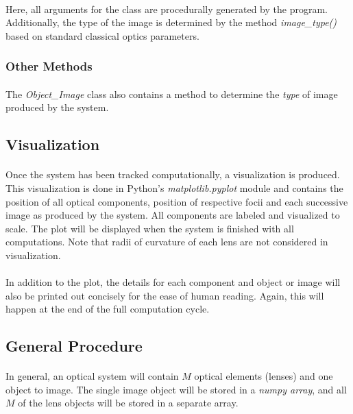 \documentclass[12pt,letterpaper]{article}
\begin{document}
\paragraph*{}Here, all arguments for the class are procedurally generated by the program. Additionally, the type of the image is determined by the method \textit{image\_type()} based on standard classical optics parameters.

\subsubsection*{Other Methods}
\paragraph*{}The \textit{Object\_Image} class also contains a method to determine the \textit{type} of image produced by the system.


\subsection{Visualization}
\paragraph*{}Once the system has been tracked computationally, a visualization is produced. This visualization is done in Python's \textit{matplotlib.pyplot} module and contains the position of all optical components, position of respective focii and each successive image as produced by the system. All components are labeled and visualized to scale. The plot will be displayed when the system is finished with all computations. Note that radii of curvature of each lens are not considered in visualization.
\paragraph*{}In addition to the plot, the details for each component and object or image will also be printed out concisely for the ease of human reading. Again, this will happen at the end of the full computation cycle.


\subsection{General Procedure}
\paragraph*{}In general, an optical system will contain $M$ optical elements (lenses) and one object to image. The single image object will be stored in a \textit{numpy array}, and all $M$ of the lens objects will be stored in a separate array.
\end{document}
